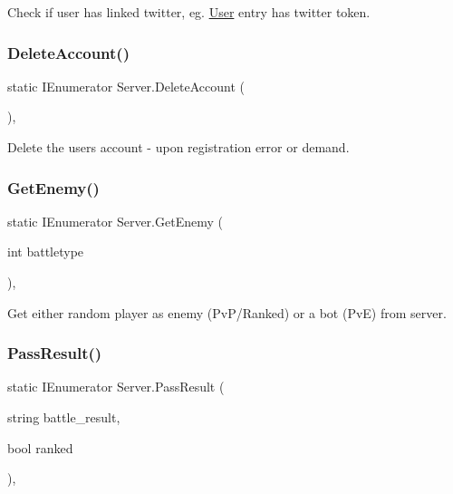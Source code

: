 Check if user has linked twitter, eg. \mbox{\hyperlink{class_user}{User}} entry has twitter token. 

\mbox{\label{class_server_a3f176e4b6cca1229cba9694566d25e32}} 
\subsubsection{\texorpdfstring{DeleteAccount()}{DeleteAccount()}}
{\footnotesize\ttfamily static I\+Enumerator Server.\+Delete\+Account (\begin{DoxyParamCaption}{ }\end{DoxyParamCaption})\hspace{0.3cm}{\ttfamily [inline]}, {\ttfamily [static]}}



Delete the user\textquotesingle{}s account -\/ upon registration error or demand. 

\mbox{\label{class_server_ab8763dec1a3a83e91962022cbcf405db}} 
\subsubsection{\texorpdfstring{GetEnemy()}{GetEnemy()}}
{\footnotesize\ttfamily static I\+Enumerator Server.\+Get\+Enemy (\begin{DoxyParamCaption}\item[{int}]{battletype }\end{DoxyParamCaption})\hspace{0.3cm}{\ttfamily [inline]}, {\ttfamily [static]}}



Get either random player as enemy (Pv\+P/\+Ranked) or a bot (PvE) from server. 

\mbox{\label{class_server_ac8137eb1cd7752cf3231cd3d1539a849}} 
\subsubsection{\texorpdfstring{PassResult()}{PassResult()}}
{\footnotesize\ttfamily static I\+Enumerator Server.\+Pass\+Result (\begin{DoxyParamCaption}\item[{string}]{battle\+\_\+result,  }\item[{bool}]{ranked }\end{DoxyParamCaption})\hspace{0.3cm}{\ttfamily [inline]}, {\ttfamily [static]}}




